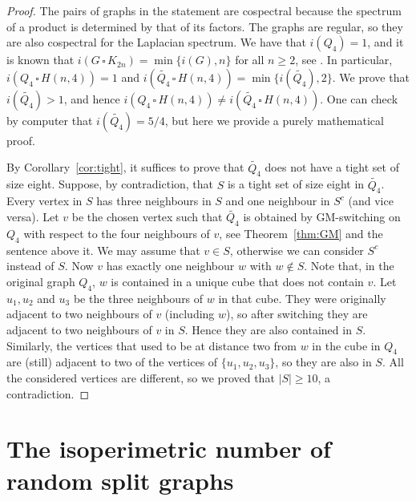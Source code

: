 \documentclass[a4paper,11pt]{article}
\theoremstyle{definition}
\newcommand{\cartesianproduct}{\,\square\,}
\begin{document}
\begin{proof}
    The pairs of graphs in the statement are cospectral because the spectrum of a product is determined by that of its factors. The graphs are regular, so they are also cospectral for the Laplacian spectrum. We have that $i(Q_4)=1$, and it is known that $i(G \cartesianproduct K_{2n}) = \min \{i(G),n\}$ for all \(n\geq2\), see \cite[Theorem~5.1]{M1989}. In particular, $i(Q_4 \cartesianproduct H(n,4)) = 1$ and $i(\widetilde{Q_4}\cartesianproduct H(n,4)) = \min\{i(\widetilde{Q_4}),2\}$. We prove that \(i(\widetilde{Q_4})>1\), and hence \(i(Q_4 \cartesianproduct H(n,4))\neq i(\widetilde{Q_4}\cartesianproduct H(n,4))\). One can check by computer that \(i(\widetilde{Q_4})=5/4\), but here we provide a purely mathematical proof.

By Corollary~\ref{cor:tight}, it suffices to prove that \(\widetilde{Q_4}\) does not have a tight set of size eight. Suppose, by contradiction, that \(S\) is a tight set of size eight in \(\widetilde{Q_4}\). Every vertex in \(S\) has three neighbours in \(S\) and one neighbour in \(S^c\) (and vice versa).
Let \(v\) be the chosen vertex such that \(\widetilde{Q_4}\) is obtained by GM-switching on \(Q_4\) with respect to the four neighbours of \(v\), see Theorem~\ref{thm:GM} and the sentence above it. We may assume that \(v\in S\), otherwise we can consider \(S^c\) instead of \(S\). Now \(v\) has exactly one neighbour \(w\) with \(w\notin S\). Note that, in the original graph \(Q_4\), \(w\) is contained in a unique cube that does not contain \(v\). Let \(u_1,u_2\) and \(u_3\) be the three neighbours of \(w\) in that cube. They were originally adjacent to two neighbours of \(v\) (including \(w\)), so after switching they are adjacent to two neighbours of \(v\) in \(S\). Hence they are also contained in \(S\). Similarly, the vertices that used to be at distance two from \(w\) in the cube in \(Q_4\) are (still) adjacent to two of the vertices of \(\{u_1,u_2,u_3\}\), so they are also in \(S\). All the considered vertices are different, so we proved that \(|S|\geq10\), a contradiction.
\end{proof}



\section{The isoperimetric number of random split graphs}\label{sec:split}
 
\end{document}
